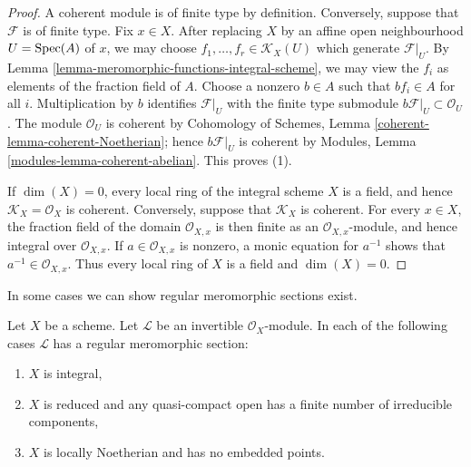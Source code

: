 \begin{proof}
A coherent module is of finite type by definition. Conversely, suppose that
$\mathcal{F}$ is of finite type. Fix $x \in X$. After replacing $X$ by an
affine open neighbourhood $U = \mathop{\mathrm{Spec}}(A)$ of $x$, we may choose
$f_1, \ldots, f_r \in \mathcal{K}_X(U)$ which generate
$\mathcal{F}|_U$. By Lemma
\ref{lemma-meromorphic-functions-integral-scheme}, we may view the $f_i$
as elements of the fraction field of $A$. Choose a nonzero $b \in A$ such
that $bf_i \in A$ for all $i$. Multiplication by $b$ identifies
$\mathcal{F}|_U$ with the finite type submodule
$b\mathcal{F}|_U \subset \mathcal{O}_U$. The module $\mathcal{O}_U$ is
coherent by Cohomology of Schemes, Lemma
\ref{coherent-lemma-coherent-Noetherian}; hence $b\mathcal{F}|_U$ is
coherent by Modules, Lemma \ref{modules-lemma-coherent-abelian}.
This proves (1).

If $\dim(X) = 0$, every local ring of the integral scheme $X$ is a field,
and hence $\mathcal{K}_X = \mathcal{O}_X$ is coherent. Conversely, suppose
that $\mathcal{K}_X$ is coherent. For every $x \in X$, the fraction field
of the domain $\mathcal{O}_{X, x}$ is then finite as an
$\mathcal{O}_{X, x}$-module, and hence integral over
$\mathcal{O}_{X, x}$. If $a \in \mathcal{O}_{X, x}$ is nonzero, a monic
equation for $a^{-1}$ shows that $a^{-1} \in \mathcal{O}_{X, x}$.
Thus every local ring of $X$ is a field and $\dim(X) = 0$.
\end{proof}

\noindent
In some cases we can show regular meromorphic sections exist.

\begin{lemma}
\label{lemma-regular-meromorphic-section-exists}
Let $X$ be a scheme.
Let $\mathcal{L}$ be an invertible $\mathcal{O}_X$-module.
In each of the following cases $\mathcal{L}$ has a regular meromorphic
section:
\begin{enumerate}
\item $X$ is integral,
\item $X$ is reduced and any quasi-compact open has a finite
number of irreducible components,
\item $X$ is locally Noetherian and has no embedded points.
\end{enumerate}
\end{lemma}


